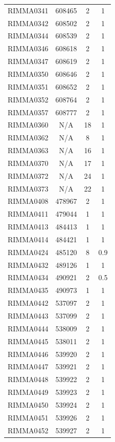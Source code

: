\documentclass[11pt]{article}
\newcounter{rowno}
\begin{document}
\begin{scriptsize}
\begin{longtable}{>{\stepcounter{rowno}}cccc}
    RIMMA0341 & 608465 & 2     & 1 \\
    RIMMA0342 & 608502 & 2     & 1 \\
    RIMMA0344 & 608539 & 2     & 1 \\
    RIMMA0346 & 608618 & 2     & 1 \\
    RIMMA0347 & 608619 & 2     & 1 \\
    RIMMA0350 & 608646 & 2     & 1 \\
    RIMMA0351 & 608652 & 2     & 1 \\
    RIMMA0352 & 608764 & 2     & 1 \\
    RIMMA0357 & 608777 & 2     & 1 \\
    RIMMA0360 & N/A & 18    & 1 \\
    RIMMA0362 & N/A & 8     & 1 \\
    RIMMA0363 & N/A & 16    & 1 \\
    RIMMA0370 & N/A & 17    & 1 \\
    RIMMA0372 & N/A & 24    & 1 \\
    RIMMA0373 & N/A & 22    & 1 \\
    RIMMA0408 & 478967 & 2     & 1 \\
    RIMMA0411 & 479044 & 1     & 1 \\
    RIMMA0413 & 484413 & 1     & 1 \\
    RIMMA0414 & 484421 & 1     & 1 \\
    RIMMA0424 & 485120 & 8     & 0.9 \\
    RIMMA0432 & 489126 & 1     & 1 \\
    RIMMA0434 & 490921 & 2     & 0.5 \\
    RIMMA0435 & 490973 & 1     & 1 \\
    RIMMA0442 & 537097 & 2     & 1 \\
    RIMMA0443 & 537099 & 2     & 1 \\
    RIMMA0444 & 538009 & 2     & 1 \\
    RIMMA0445 & 538011 & 2     & 1 \\
    RIMMA0446 & 539920 & 2     & 1 \\
    RIMMA0447 & 539921 & 2     & 1 \\
    RIMMA0448 & 539922 & 2     & 1 \\
    RIMMA0449 & 539923 & 2     & 1 \\
    RIMMA0450 & 539924 & 2     & 1 \\
    RIMMA0451 & 539926 & 2     & 1 \\
    RIMMA0452 & 539927 & 2     & 1 \\

\end{longtable}
\end{scriptsize}
\end{document}
